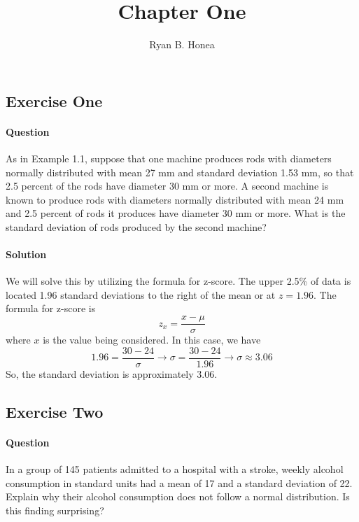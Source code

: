 \documentclass[]{article}
\title{Chapter One}
\author{Ryan B. Honea}
\date{}
\let\oldparagraph\paragraph
\renewcommand{\paragraph}[1]{\oldparagraph{#1}\mbox{}}
\begin{document}
\maketitle

\subsection{Exercise One}\label{exercise-one}

\paragraph{Question}\label{question}

As in Example 1.1, suppose that one machine produces rods with diameters
normally distributed with mean 27 mm and standard deviation 1.53 mm, so
that 2.5 percent of the rods have diameter 30 mm or more. A second
machine is known to produce rods with diameters normally distributed
with mean 24 mm and 2.5 percent of rods it produces have diameter 30 mm
or more. What is the standard deviation of rods produced by the second
machine?

\paragraph{Solution}\label{solution}

We will solve this by utilizing the formula for z-score. The upper 2.5\%
of data is located 1.96 standard deviations to the right of the mean or
at \(z = 1.96\). The formula for z-score is \[
        z_x = \frac{x - \mu}{\sigma}
    \] where \(x\) is the value being considered. In this case, we have
\[
        1.96 = \frac{30 - 24}{\sigma} \rightarrow \sigma = \frac{30 - 24}{1.96}
        \rightarrow \sigma \approx 3.06
    \] So, the standard deviation is approximately 3.06.

\subsection{Exercise Two}\label{exercise-two}

\paragraph{Question}\label{question-1}

In a group of 145 patients admitted to a hospital with a stroke, weekly
alcohol consumption in standard units had a mean of 17 and a standard
deviation of 22. Explain why their alcohol consumption does not follow a
normal distribution. Is this finding surprising?
\end{document}
